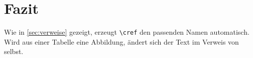 \chapter{Fazit}
\label{ch:fazit}

Wie in \cref{sec:verweise} gezeigt, erzeugt \verb|\cref| den passenden
Namen automatisch. Wird aus einer Tabelle eine Abbildung, ändert sich der Text
im Verweis von selbst.
